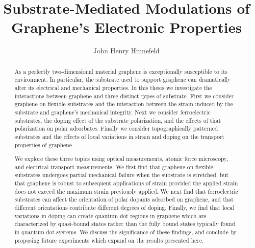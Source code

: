 \documentclass[edeposit,fullpage,draftthesis]{uiucthesis2009}
\begin{document}
\title{Substrate-Mediated Modulations of Graphene's Electronic Properties}
\author{John Henry Hinnefeld}
\phdthesis
{}
\maketitle

\frontmatter

\begin{abstract}

As a perfectly two-dimensional material graphene is exceptionally susceptible to
its environment. In particular, the substrate used to support graphene can dramatically
alter its electrical and mechanical properties.
In this thesis we investigate the interactions between graphene and three distinct
types of substrate.
First we consider graphene on flexible substrates and the interaction
between the strain induced by the substrate and graphene's mechanical integrity.
Next we consider ferroelectric substrates, the doping effect of the substrate polarization,
and the effects of that polarization on polar adsorbates.
Finally we consider topographically patterned substrates and the effects of local variations
in strain and doping on the transport properties of graphene.

We explore these three topics using optical measurements, atomic force microscopy, and electrical
transport measurements.
We first find that graphene on flexible substrates undergoes partial mechanical failure when
the substrate is stretched, but that graphene is robust to subsequent applications of strain
provided the applied strain does not exceed the maximum strain previously applied.
We next find that ferroelectric substrates can affect the orientation of polar dopants adsorbed
on graphene, and that different orientations contribute different degrees of doping.
Finally, we find that local variations in doping can create quantum dot regions in graphene
which are characterized by quasi-bound states rather than the fully bound states typically found
in quantum dot systems.
We discuss the significance of these findings, and conclude by proposing future experiments which
expand on the results presented here.




\end{abstract}
\end{document}
